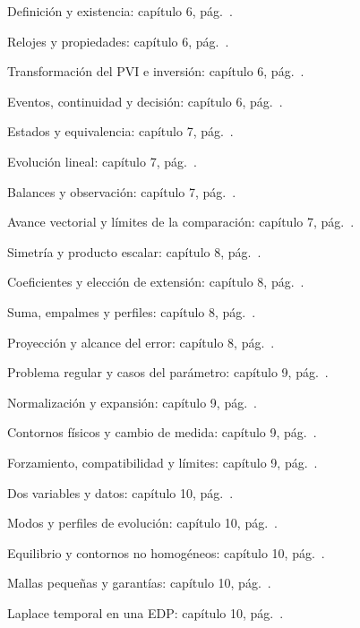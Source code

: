Definición y existencia: capítulo 6, pág.\ \pageref{CH06-B01}.\par
Relojes y propiedades: capítulo 6, pág.\ \pageref{CH06-B02}.\par
Transformación del PVI e inversión: capítulo 6, pág.\ \pageref{CH06-B03}.\par
Eventos, continuidad y decisión: capítulo 6, pág.\ \pageref{CH06-B04}.\par
Estados y equivalencia: capítulo 7, pág.\ \pageref{CH07-B01}.\par
Evolución lineal: capítulo 7, pág.\ \pageref{CH07-B02}.\par
Balances y observación: capítulo 7, pág.\ \pageref{CH07-B03}.\par
Avance vectorial y límites de la comparación: capítulo 7, pág.\ \pageref{CH07-B04}.\par
Simetría y producto escalar: capítulo 8, pág.\ \pageref{CH08-B01}.\par
Coeficientes y elección de extensión: capítulo 8, pág.\ \pageref{CH08-B02}.\par
Suma, empalmes y perfiles: capítulo 8, pág.\ \pageref{CH08-B03}.\par
Proyección y alcance del error: capítulo 8, pág.\ \pageref{CH08-B04}.\par
Problema regular y casos del parámetro: capítulo 9, pág.\ \pageref{CH09-B01}.\par
Normalización y expansión: capítulo 9, pág.\ \pageref{CH09-B02}.\par
Contornos físicos y cambio de medida: capítulo 9, pág.\ \pageref{CH09-B03}.\par
Forzamiento, compatibilidad y límites: capítulo 9, pág.\ \pageref{CH09-B04}.\par
Dos variables y datos: capítulo 10, pág.\ \pageref{CH10-B01}.\par
Modos y perfiles de evolución: capítulo 10, pág.\ \pageref{CH10-B02}.\par
Equilibrio y contornos no homogéneos: capítulo 10, pág.\ \pageref{CH10-B03}.\par
Mallas pequeñas y garantías: capítulo 10, pág.\ \pageref{CH10-B04}.\par
Laplace temporal en una EDP: capítulo 10, pág.\ \pageref{CH10-B05}.\par
